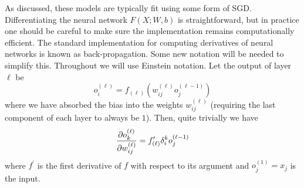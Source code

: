 \documentclass{subfile}
\begin{document}
As discussed, these models are typically fit using some form of SGD.  Differentiating the neural network $F(X;W,b)$ is straightforward, but in practice one
should be careful to make sure the implementation remains computationally efficient.  The standard implementation for computing derivatives of neural networks
is known as back-propagation.  Some new notation will be needed to simplify this.  Throughout we will use Einstein notation.  Let the output of layer $\ell$ be
\begin{equation}
    o^{(\ell)}_{i} = f_{(\ell)}(w^{(\ell)}_{ij}o^{(\ell-1)}_{j})
\end{equation}
where we have absorbed the bias into the weights $w^{(\ell)}_{ij}$ (requiring the last component of each layer to always be $1$).  Then, quite trivially we have
\begin{equation}
    \frac{\partial o^{(\ell)}_{k}}{\partial w^{(\ell)}_{ij}} = {f}^{\prime}_{(\ell)}\delta^{k}_{i}o^{(\ell-1)}_{j}
\end{equation}
where $f^{\prime}$ is the first derivative of $f$ with respect to its argument and $o^{(1)}_{j}=x_{j}$ is the input.
\end{document}
